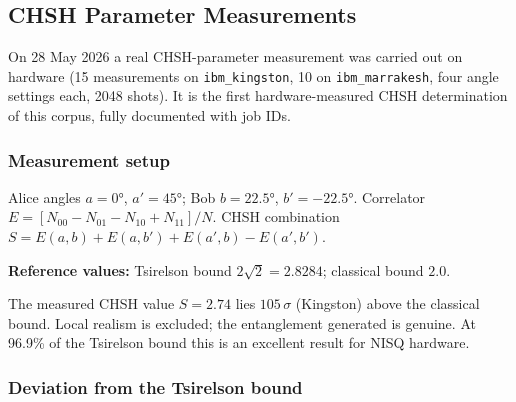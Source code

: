 \subsection{CHSH Parameter Measurements}

On 28 May 2026 a real CHSH-parameter measurement was carried out on hardware (15 measurements on \texttt{ibm\_kingston}, 10 on \texttt{ibm\_marrakesh}, four angle settings each, 2048 shots). It is the first hardware-measured CHSH determination of this corpus, fully documented with job IDs.

\subsubsection{Measurement setup}

Alice angles $a=0°$, $a'=45°$; Bob $b=22.5°$, $b'=-22.5°$. Correlator $E = [N_{00}-N_{01}-N_{10}+N_{11}]/N$. CHSH combination $S = E(a,b)+E(a,b')+E(a',b)-E(a',b')$.

\begin{table}[h]
	\centering
	\caption{CHSH measurement: Hardware results (28 May 2026)}
	\label{tab:chsh_real}
\end{table}

\textbf{Reference values:} Tsirelson bound $2\sqrt{2} = 2.8284$; classical bound $2.0$.

\begin{keyresult}
	The measured CHSH value $S = 2.74$ lies $105\,\sigma$ (Kingston) above the classical bound. Local realism is excluded; the entanglement generated is genuine. At 96.9\% of the Tsirelson bound this is an excellent result for NISQ hardware.
\end{keyresult}

\subsubsection{Deviation from the Tsirelson bound}

